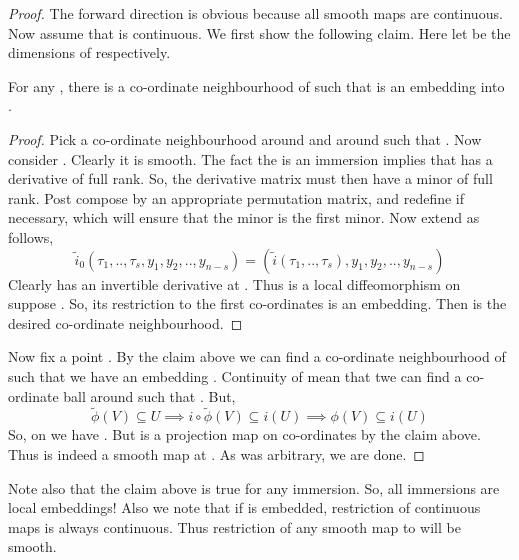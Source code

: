 \documentclass{article}
\begin{document}
\begin{proof}
    The forward direction is obvious because all smooth maps are continuous. Now assume that \mm{\tilde{\phi}} is continuous.
    We first show the following claim. Here let  be the dimensions of  respectively.

    \begin{claim*}
        For any , there is a co-ordinate neighbourhood  of  such that  is an embedding into .
    \end{claim*}
    \begin{proof}
        Pick a co-ordinate neighbourhood  around  and  around  such that .
        Now consider . Clearly it is smooth. The fact the  is an immersion implies that  has a derivative of full rank.
        So, the derivative matrix must then have a  minor of full rank. Post compose \mm{\tau} by an appropriate permutation matrix, and redefine 
        if necessary, which will ensure that the minor is the first  minor. Now extend  as follows, $$\tilde{i}_0(\tau_1,..,\tau_s,y_1,y_2,..,y_{n-s}) = (\tilde{i}(\tau_1,..,\tau_s),y_1,y_2,..,y_{n-s})$$
        Clearly  has an invertible derivative at . Thus is a local diffeomorphism on suppose . So, its restriction to the first  co-ordinates is an embedding.
        Then  is the desired co-ordinate neighbourhood.
    \end{proof}

    Now fix a point . By the claim above we can find a co-ordinate neighbourhood  of  such that we have an embedding .
    Continuity of \mm{\tilde{\phi}} mean that twe can find a co-ordinate ball  around  such that . But, 
    $$\tilde{\phi}(V)\subseteq U\implies i\circ \tilde{\phi}(V)\subseteq i(U)\implies \phi(V)\subseteq i(U)$$
    So, on  we have . But  is a projection map on co-ordinates by the claim above. Thus \mm{\tilde{\phi}} is indeed a smooth map at .
    As  was arbitrary, we are done.
\end{proof}

Note also that the claim above is true for any immersion. So, all immersions are local embeddings! Also we note that if 
is embedded, restriction of continuous maps is always continuous. Thus restriction of any smooth map to  will be smooth.
\end{document}
